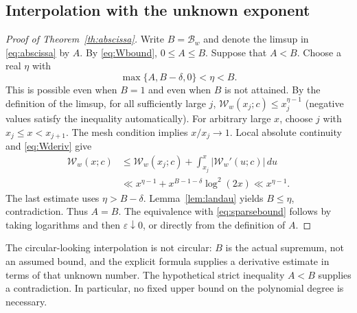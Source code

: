\documentclass[11pt]{article}
\theoremstyle{remark}\newtheorem{remark}[theorem]{Remark}
\newcommand{\B}{\mathcal B}\newcommand{\W}{\mathcal W}
\begin{document}
\subsection{Interpolation with the unknown exponent}
\begin{proof}[Proof of Theorem~\ref{th:abscissa}]
Write $B=\B_w$ and denote the limsup in \eqref{eq:abscissa} by $A$. By \eqref{eq:Wbound}, $0\le A\le B$. Suppose that $A<B$. Choose a real $\eta$ with
\[
 \max\{A,B-\delta,0\}<\eta<B.
\]
This is possible even when $B=1$ and even when $B$ is not attained. By the definition of the limsup, for all sufficiently large $j$,
$\W_w(x_j;c)\le x_j^{\eta-1}$ (negative values satisfy the inequality automatically). For arbitrary large $x$, choose $j$ with $x_j\le x<x_{j+1}$. The mesh condition implies $x/x_j\to1$. Local absolute continuity and \eqref{eq:Wderiv} give
\begin{align*}
 \W_w(x;c)&\le \W_w(x_j;c)+\int_{x_j}^x|\W_w'(u;c)|\,du\\
 &\ll x^{\eta-1}+x^{B-1-\delta}\log^2(2x)
 \ll x^{\eta-1}.
\end{align*}
The last estimate uses $\eta>B-\delta$. Lemma~\ref{lem:landau} yields $B\le\eta$, contradiction. Thus $A=B$. The equivalence with \eqref{eq:sparsebound} follows by taking logarithms and then $\varepsilon\downarrow0$, or directly from the definition of $A$.
\end{proof}
The circular-looking interpolation is not circular: $B$ is the actual supremum, not an assumed bound, and the explicit formula supplies a derivative estimate in terms of that unknown number. The hypothetical strict inequality $A<B$ supplies a contradiction. In particular, no fixed upper bound on the polynomial degree is necessary.
\end{document}
